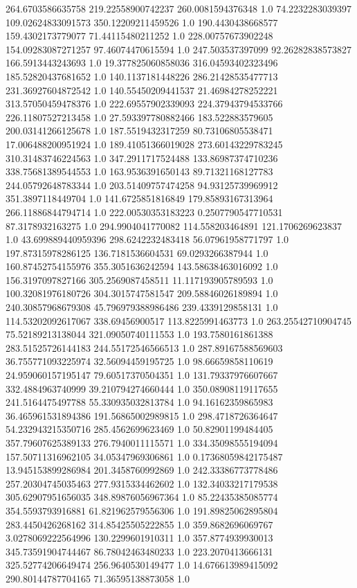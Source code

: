 264.6703586635758	219.22558900742237	260.0081594376348	1.0
74.2232283039397	109.02624833091573	350.12209211459526	1.0
190.4430438668577	159.4302173779077	71.44115480211252	1.0
228.00757673902248	154.09283087271257	97.46074470615594	1.0
247.503537397099	92.26282838573827	166.5913443243693	1.0
19.377825060858036	316.04593402323496	185.52820437681652	1.0
140.1137181448226	286.21428535477713	231.36927604872542	1.0
140.55450209441537	21.46984278252221	313.57050459478376	1.0
222.69557902339093	224.37943794533766	226.11807527213458	1.0
27.593397780882466	183.522883579605	200.03141266125678	1.0
187.5519432317259	80.73106805538471	17.006488200951924	1.0
189.41051366019028	273.60143229783245	310.31483746224563	1.0
347.2911717524488	133.86987374710236	338.75681389544553	1.0
163.9536391650143	89.71321168127783	244.05792648783344	1.0
203.51409757474258	94.93125739969912	351.3897118449704	1.0
141.6725851816849	179.85893167313964	266.11886844794714	1.0
222.00530353183223	0.2507790547710531	87.3178932163275	1.0
294.9904041770082	114.558203464891	121.1706269623837	1.0
43.699889440959396	298.6242232483418	56.07961958771797	1.0
197.87315978286125	136.7181536604531	69.0293266387944	1.0
160.87452754155976	355.3051636242594	143.58638463016092	1.0
156.3197097827166	305.2569087458511	11.117193905789593	1.0
100.32081976180726	304.3015747581547	209.58846026189894	1.0
240.30857968679308	45.796979388986486	239.4339129858131	1.0
114.53202092617067	338.69456900517	113.8225991463773	1.0
263.25542710904745	75.52189213138044	321.09050740111553	1.0
193.7580161861388	283.51525726144183	244.55172546566513	1.0
287.89167588569603	36.755771093225974	32.56094459195725	1.0
98.66659858110619	24.959060157195147	79.60517370504351	1.0
131.79337976607667	332.4884963740999	39.210794274660444	1.0
350.08908119117655	241.5164475497788	55.330935032813784	1.0
94.16162359865983	36.465961531894386	191.56865002989815	1.0
298.4718726364647	54.232943215350716	285.4562699623469	1.0
50.82901199484405	357.79607625389133	276.7940011115571	1.0
334.35098555194094	157.50711316962105	34.05347969306861	1.0
0.17368059842175487	13.945153899286984	201.3458760992869	1.0
242.33386773778486	257.20304745035463	277.9315334462602	1.0
132.34033217179538	305.62907951656035	348.89876056967364	1.0
85.22435385085774	354.5593793916881	61.821962579556306	1.0
191.89825062895804	283.4450426268162	314.85425505222855	1.0
359.8682696069767	3.0278069222564996	130.2299601910311	1.0
357.8774939930013	345.73591904744467	86.78042463480233	1.0
223.2070413666131	325.52774206649474	256.9640530149477	1.0
14.676613989415092	290.80144787704165	71.36595138873058	1.0

